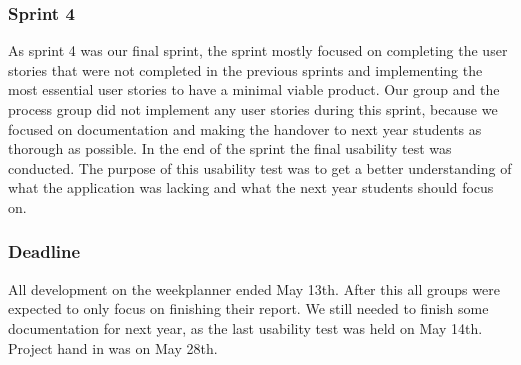 \subsubsection{Sprint 4}
As sprint 4 was our final sprint, the sprint mostly focused on completing the user stories that were not completed in the previous sprints and implementing the most essential user stories to have a minimal viable product.
Our group and the process group did not implement any user stories during this sprint, because we focused on documentation and making the handover to next year students as thorough as possible.
In the end of the sprint the final usability test was conducted.
The purpose of this usability test was to get a better understanding of what the application was lacking and what the next year students should focus on.

\subsubsection{Deadline}
All development on the weekplanner ended May 13th. After this all groups were expected to only focus on finishing their report.
We still needed to finish some documentation for next year, as the last usability test was held on May 14th.
Project hand in was on May 28th.
